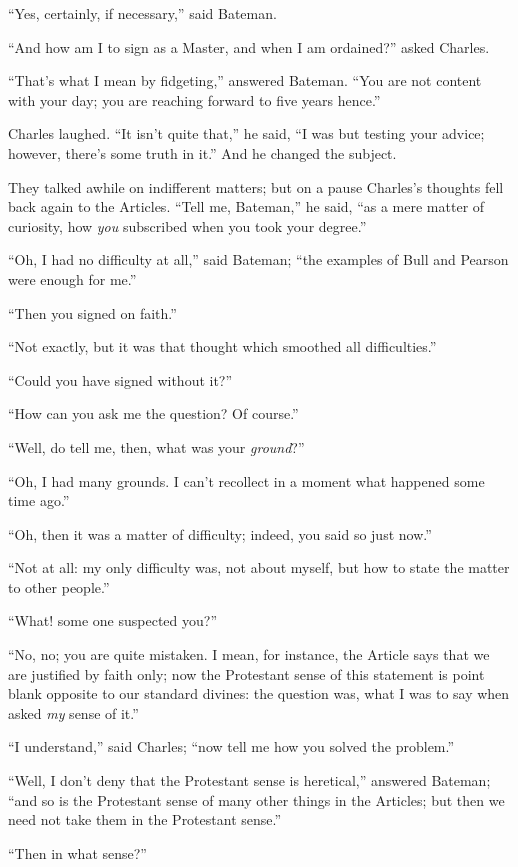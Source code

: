 ``Yes, certainly, if necessary,'' said Bateman.

``And how am I to sign as a Master, and when I am
ordained?'' asked Charles.

``That's what I mean by fidgeting,'' answered Bateman.
``You are not content with your day; you are reaching forward to
five years hence.''

Charles laughed. ``It isn't quite that,'' he said, ``I
was but testing your advice; however, there's some truth in it.''
And he changed the subject.

They talked awhile on indifferent matters; but on a pause Charles's
thoughts fell back again to the Articles. ``Tell me,
Bateman,'' he said, ``as a mere matter of curiosity, how \emph{you}
subscribed when you took your degree.''

``Oh, I had no difficulty at all,'' said Bateman; ``the
examples of Bull and Pearson were enough for me.''

``Then you signed on faith.''

``Not exactly, but it was that thought which smoothed all
difficulties.''

``Could you have signed without it?''

``How can you ask me the question? Of course.''

``Well, do tell me, then, what was your \emph{ground}?''

``Oh, I had many grounds. I can't recollect in a moment what
happened some time ago.''

``Oh, then it was a matter of difficulty; indeed, you said so
just now.''

``Not at all: my only difficulty was, not about myself, but how
to state the matter to other people.''

``What! some one suspected you?''

``No, no; you are quite mistaken. I mean, for instance, the
Article says that we are justified by faith only; now the Protestant
sense of this statement is point blank opposite to our standard
divines: the question was, what I was to say when asked \emph{my}
sense of it.''

``I understand,'' said Charles; ``now tell me how you
solved the problem.''

``Well, I don't deny that the Protestant sense is
heretical,'' answered Bateman; ``and so is the Protestant
sense of many other things in the Articles; but then we need not take
them in the Protestant sense.''

``Then in what sense?''

